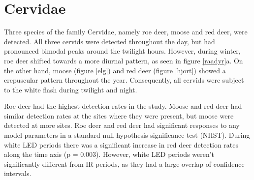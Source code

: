 \begin{table}[ht]  %
\caption[Model results]
{ \footnotesize 
Results of Poisson mixed effects models on detection rate of species at 56 different locations in southeastern Norway, with three different treatment levels interacting with time since deployment (Time); periods from control sites (Intercept), periods with only IR camera (IR), periods with an additional white LED camera (wLED). Second Generation P-Values (SGPV) is identical to the proportion of a parameter that is inside the Region of Practical Equivalence (ROPE) in an equivalence test. Random effects were location ID and week of year. %
}
\label{tab:param}
\footnotesize

\end{table}

\pagestyle{empty} %
%

\clearpage %
\pagestyle{fancy} %
\section{Cervidae}
Three species of the family Cervidae, namely roe deer, moose and red deer, were detected.
All three cervids were detected throughout the day, but had pronounced bimodal peaks around the twilight hours. %
However, during winter, roe deer shifted towards a more diurnal pattern, as seen in figure \ref{raadyr}a. 
On the other hand, moose (figure \ref{elg}) and red deer (figure \ref{hjort}) showed a crepuscular pattern throughout the year.
Consequently, all cervids were subject to the white flash during twilight and night. %

Roe deer had the highest detection rates in the study. Moose and red deer had similar detection rates at the sites where they were present, but moose were detected at more sites.
Roe deer and red deer had significant responses to any model parameters in a standard null hypothesis significance test (NHST). During white LED periods there was a significant increase in red deer detection rates along the time axis (p = 0.003). However, white LED periods weren't significantly different from IR periods, as they had a large overlap of confidence intervals. 

